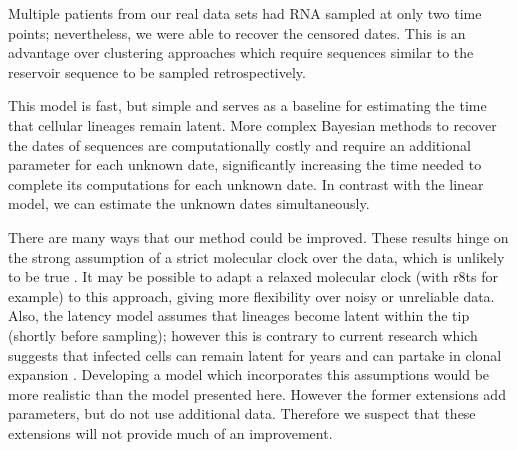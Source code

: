 \documentclass[12pt]{article}
\begin{document}




Multiple patients from our real data sets had RNA sampled at only two time points; nevertheless, we were able to recover the censored dates.
This is an advantage over clustering approaches \citep{Buzon14} which require sequences similar to the reservoir sequence to be sampled retrospectively.

This model is fast, but simple and serves as a baseline for estimating the time that cellular lineages remain latent.
More complex Bayesian methods \citep{Shapiro11} to recover the dates of sequences are computationally costly and require an additional parameter for each unknown date, significantly increasing the time needed to complete its computations for each unknown date.
In contrast with the linear model, we can estimate the unknown dates simultaneously.

There are many ways that our method could be improved.
These results hinge on the strong assumption of a strict molecular clock over the data, which is unlikely to be true \citep{Shankarappa99}. 
It may be possible to adapt a relaxed molecular clock (with r8ts \citep{r8ts} for example) to this approach, giving more flexibility over noisy or unreliable data.
Also, the latency model assumes that lineages become latent within the tip (shortly before sampling); however this is contrary to current research which suggests that infected cells can remain latent for years and can partake in clonal expansion \citep{Maldarelli14}.
Developing a model which incorporates this assumptions
would be more realistic than the model presented here.
However the former extensions add parameters, but do not use additional data.
Therefore we suspect that these extensions will not provide much of an improvement.
\end{document}
